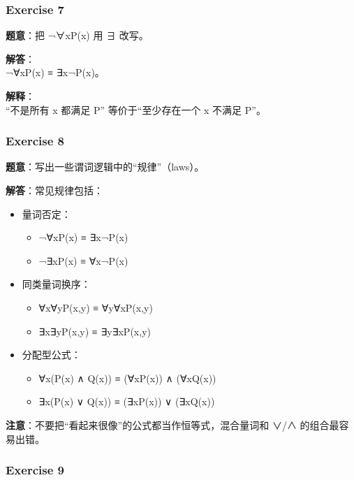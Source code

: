 \documentclass[
  11pt,
]{article}
\providecommand{\tightlist}{%
  \setlength{\itemsep}{0pt}\setlength{\parskip}{0pt}}
\begin{document}
\subsubsection{Exercise 7}\label{exercise-7}

\textbf{题意}：把 ¬∀xP(x) 用 ∃ 改写。

\textbf{解答}：\\
¬∀xP(x) ≡ ∃x¬P(x)。

\textbf{解释}：\\
``不是所有 x 都满足 P'' 等价于``至少存在一个 x 不满足 P''。

\subsubsection{Exercise 8}\label{exercise-8}

\textbf{题意}：写出一些谓词逻辑中的``规律''（laws）。

\textbf{解答}：常见规律包括：

\begin{itemize}
\tightlist
\item
  量词否定：

  \begin{itemize}
  \tightlist
  \item
    ¬∀xP(x) ≡ ∃x¬P(x)
  \item
    ¬∃xP(x) ≡ ∀x¬P(x)
  \end{itemize}
\item
  同类量词换序：

  \begin{itemize}
  \tightlist
  \item
    ∀x∀yP(x,y) ≡ ∀y∀xP(x,y)
  \item
    ∃x∃yP(x,y) ≡ ∃y∃xP(x,y)
  \end{itemize}
\item
  分配型公式：

  \begin{itemize}
  \tightlist
  \item
    ∀x(P(x) ∧ Q(x)) ≡ (∀xP(x)) ∧ (∀xQ(x))
  \item
    ∃x(P(x) ∨ Q(x)) ≡ (∃xP(x)) ∨ (∃xQ(x))
  \end{itemize}
\end{itemize}

\textbf{注意}：不要把``看起来很像''的公式都当作恒等式，混合量词和 ∨/∧
的组合最容易出错。

\subsubsection{Exercise 9}\label{exercise-9}
\end{document}
